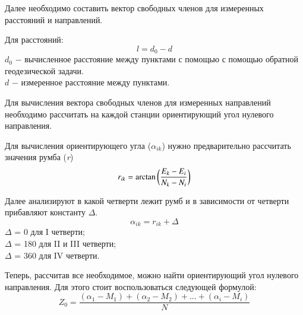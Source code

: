 \documentclass[a4paper]{article}
\begin{document}
\large{
\par Далее необходимо составить вектор свободных членов для измеренных расстояний и направлений. 
\par Для расстояний:
\begin{equation}
    l = d_{0} - d
\end{equation}
$d_0$ $-$ вычисленное расстояние между пунктами с помощью с помощью обратной геодезической задачи.\\
$d$ $-$ измеренное расстояние между пунктами.\par
Для вычисления вектора свободных членов для измеренных направлений необходимо рассчитать на каждой станции ориентирующий угол нулевого направления.\par 
Для вычисления ориентирующего угла ($\alpha_{ik}$) нужно предварительно рассчитать значения румба (\textit{r}) 
\begin{equation}
r_{ik} = \arctan\bigg{(}\frac{E_k-E_i}{N_k-N_i}\bigg{)}
\end{equation}
\par Далее анализируют в какой четверти лежит румб и в зависимости от четверти прибавляют константу $\Delta$.
\begin{equation}
    \alpha_{ik} = r_{ik} + \Delta
\end{equation}
$\Delta$ = 0 для I четверти;\\
$\Delta$ = 180 для II и III четверти;\\
$\Delta$ = 360 для IV четверти.
\par Теперь, рассчитав все необходимое, можно найти ориентирующий угол нулевого направления. Для этого стоит воспользоваться следующей формулой:
\begin{equation}
    Z_0=\frac{(\alpha_1-M_1) + (\alpha_2-M_2) + ... + (\alpha_i-M_i)}{N}
\end{equation}
}
\end{document}

